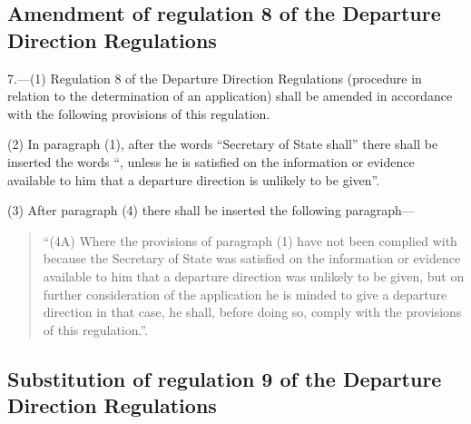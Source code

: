 \documentclass[12pt,a4paper]{article}
\begin{document}
\subsection[7. Amendment of regulation 8 of the Departure Direction Regulations]{Amendment of regulation 8 of the Departure Direction Regulations}

7.—(1) Regulation 8 of the Departure Direction Regulations (procedure in relation to the determination of an application) shall be amended in accordance with the following provisions of this regulation.

(2) In paragraph (1), after the words “Secretary of State shall” there shall be inserted the words “, unless he is satisfied on the information or evidence available to him that a departure direction is unlikely to be given”.

(3) After paragraph (4) there shall be inserted the following paragraph—
\begin{quotation}
“(4A) Where the provisions of paragraph (1) have not been complied with because the Secretary of State was satisfied on the information or evidence available to him that a departure direction was unlikely to be given, but on further consideration of the application he is minded to give a departure direction in that case, he shall, before doing so, comply with the provisions of this regulation.”.
\end{quotation}

\subsection[8. Substitution of regulation 9 of the Departure Direction Regulations]{Substitution of regulation 9 of the Departure Direction Regulations}
\end{document}
